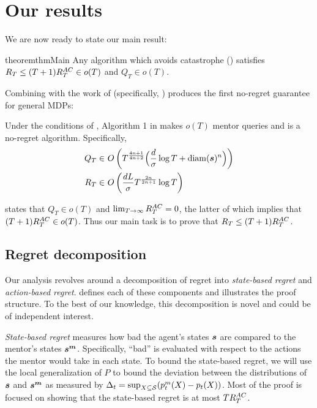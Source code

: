 
\section{Our results}\label{sec:main}

We are now ready to state our main result:

\begin{restatable}{theorem}{thmMain}
\label{thm:main}
Any algorithm which avoids catastrophe () satisfies $R_T \le (T+1)R_T^{AC}\in o(T)$ and $Q_T \in o(T)$.
\end{restatable}

Combining  with the work of \citet{plaut_avoiding_2024} (specifically, ) produces the first no-regret guarantee for general MDPs:

\begin{theorem}
\label{thm:combined}
Under the conditions of , Algorithm 1 in \citet{plaut_avoiding_2024} makes $o(T)$ mentor queries and is a no-regret algorithm. Specifically,
\begin{align*}
Q_T \in&\ O\left(T^\frac{4n+1}{4n+2}\Big(\frac{d}{\sigma} \log T + \operatorname*{diam}(\boldsymbol{s})^n\Big)\right)\\
R_T  \in&\ O\left(\frac{dL}{\sigma}T^\frac{2n}{2n+1} \log T\right)
\end{align*}
\end{theorem}

 states that $Q_T \in o(T)$ and $\lim_{T\to\infty} R_T^{AC} = 0$, the latter of which implies that $(T+1)R_T^{AC} \in o(T)$. Thus our main task is to prove that $R_T \le (T+1)R_T^{AC}$.

\subsection{Regret decomposition}

Our analysis revolves around a decomposition of regret into \emph{state-based regret} and \emph{action-based regret}.  defines each of these components and illustrates the proof structure. To the best of our knowledge, this decomposition is novel and could be of independent interest.

\emph{State-based regret} measures how bad the agent's states $\boldsymbol{s}$ are compared to the mentor's states $\boldsymbol{s^m}$. Specifically, ``bad'' is evaluated with respect to the actions the mentor would take in each state. To bound the state-based regret, we will use the local generalization of $P$ to bound the deviation between the distributions of $\boldsymbol{s}$ and $\boldsymbol{s^m}$ as measured by $\Delta_t = \sup_{X\subseteq \mathcal{S}}(p_t^m(X) - p_t(X))$. Most of the proof is focused on showing that the state-based regret is at most $T R_T^{AC}$.

